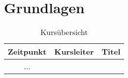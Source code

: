 \chapter{Grundlagen}

\begin{table}
\caption{ Kursübersicht}
\begin{tabular}{|c|c|c|}
\hline
Zeitpunkt & Kursleiter & Titel \\
\hline 
 ...   
\end{tabular}
\end{table}
